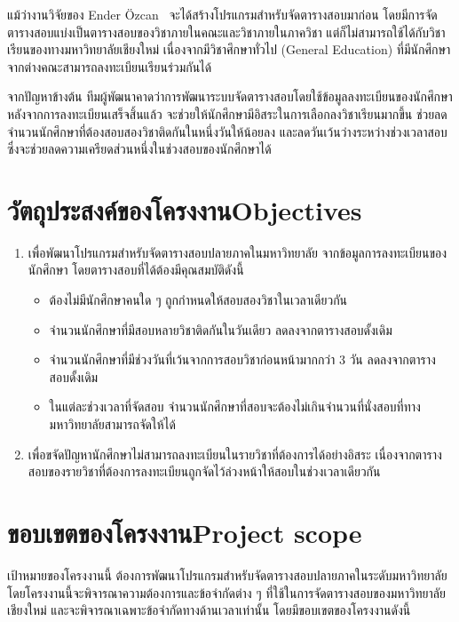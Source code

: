แม้ว่างานวิจัยของ Ender {\"O}zcan~\cite{fes} จะได้สร้างโปรแกรมสำหรับจัดตารางสอบมาก่อน โดยมีการจัดตารางสอบแบ่งเป็นตารางสอบของวิชาภายในคณะและวิชาภายในภาควิชา 
แต่ก็ไม่สามารถใช้ได้กับวิชาเรียนของทางมหาวิทยาลัยเชียงใหม่ เนื่องจากมีวิชาศึกษาทั่วไป (General Education) ที่มีนักศึกษาจากต่างคณะสามารถลงทะเบียนเรียนร่วมกันได้

จากปัญหาข้างต้น ทีมผู้พัฒนาคาดว่าการพัฒนาระบบจัดตารางสอบโดยใช้ข้อมูลลงทะเบียนของนักศึกษา หลังจากการลงทะเบียนเสร็จสิ้นแล้ว 
จะช่วยให้นักศึกษามีอิสระในการเลือกลงวิชาเรียนมากขึ้น ช่วยลดจำนวนนักศึกษาที่ต้องสอบสองวิชาติดกันในหนึ่งวันให้น้อยลง และลดวันเว้นว่างระหว่างช่วงเวลาสอบ
ซึ่งจะช่วยลดความเครียดส่วนหนึ่งในช่วงสอบของนักศึกษาได้

\section{\ifcpe วัตถุประสงค์ของโครงงาน\else Objectives\fi}
\label{sec:Objectives}
\begin{enumerate}
    \item เพื่อพัฒนาโปรแกรมสำหรับจัดตารางสอบปลายภาคในมหาวิทยาลัย จากข้อมูลการลงทะเบียนของนักศึกษา โดยตารางสอบที่ได้ต้องมีคุณสมบัติดังนี้
    \begin{itemize}
        \item ต้องไม่มีนักศึกษาคนใด ๆ ถูกกำหนดให้สอบสองวิชาในเวลาเดียวกัน
        \item จำนวนนักศึกษาที่มีสอบหลายวิชาติดกันในวันเดียว ลดลงจากตารางสอบดั้งเดิม
        \item จำนวนนักศึกษาที่มีช่วงวันที่เว้นจากการสอบวิชาก่อนหน้ามากกว่า 3 วัน ลดลงจากตารางสอบดั้งเดิม
        \item ในแต่ละช่วงเวลาที่จัดสอบ จำนวนนักศึกษาที่สอบจะต้องไม่เกินจำนวนที่นั่งสอบที่ทางมหาวิทยาลัยสามารถจัดให้ได้
    \end{itemize}
    \item เพื่อขจัดปัญหานักศึกษาไม่สามารถลงทะเบียนในรายวิชาที่ต้องการได้อย่างอิสระ เนื่องจากตารางสอบของรายวิชาที่ต้องการลงทะเบียนถูกจัดไว้ล่วงหน้าให้สอบในช่วงเวลาเดียวกัน
\end{enumerate}

\section{\ifcpe ขอบเขตของโครงงาน\else Project scope\fi}
เป้าหมายของโครงงานนี้ ต้องการพัฒนาโปรแกรมสำหรับจัดตารางสอบปลายภาคในระดับมหาวิทยาลัย
โดยโครงงานนี้จะพิจารณาความต้องการและข้อจำกัดต่าง ๆ ที่ใช้ในการจัดตารางสอบของมหาวิทยาลัยเชียงใหม่
และจะพิจารณาเฉพาะข้อจำกัดทางด้านเวลาเท่านั้น โดยมีขอบเขตของโครงงานดังนี้ 
